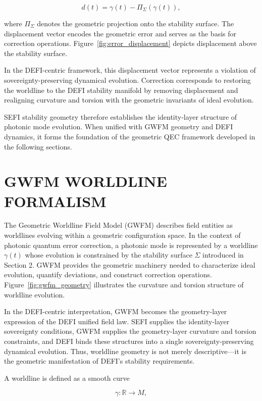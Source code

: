 \documentclass[aip,adv,reprint,floatfix]{revtex4-2}
\begin{document}
\[
d(t) = \gamma(t) - \Pi_{\Sigma}(\gamma(t)),
\]


where $\Pi_{\Sigma}$ denotes the geometric projection onto the stability surface.\cite{DuttonElectronField2026} The displacement vector encodes the geometric error and serves as the basis for correction operations. Figure~\ref{fig:error_displacement} depicts displacement above the stability surface.

In the DEFI-centric framework, this displacement vector represents a violation of sovereignty-preserving dynamical evolution.\cite{DuttonSEFI2026} Correction corresponds to restoring
the worldline to the DEFI stability manifold by removing
displacement and realigning curvature and torsion with
the geometric invariants of ideal evolution.

SEFI stability geometry therefore establishes the
identity-layer structure of photonic mode evolution.
When unified with GWFM geometry and DEFI dynamics, it forms the foundation of the geometric QEC framework developed in the following sections.
\section{GWFM WORLDLINE FORMALISM}

The Geometric Worldline Field Model (GWFM) describes field entities as worldlines evolving within a geometric configuration space.\cite{DuttonElectronField2026} In the context of photonic
quantum error correction, a photonic mode is represented
by a worldline $\gamma(t)$ whose evolution is constrained by
the stability surface $\Sigma$ introduced in Section 2. GWFM
provides the geometric machinery needed to characterize
ideal evolution, quantify deviations, and construct correction operations. Figure~\ref{fig:gwfm_geometry} illustrates
the curvature and torsion structure of worldline evolution.

In the DEFI-centric interpretation, GWFM becomes
the geometry-layer expression of the DEFI unified field
law.\cite{DuttonSEFI2026,DuttonElectronField2026} SEFI supplies the identity-layer sovereignty conditions, GWFM supplies the geometry-layer curvature
and torsion constraints, and DEFI binds these structures
into a single sovereignty-preserving dynamical evolution.
Thus, worldline geometry is not merely descriptive—it is
the geometric manifestation of DEFI’s stability requirements.

A worldline is defined as a smooth curve


\[
\gamma : \mathbb{R} \rightarrow M,
\]
\end{document}
